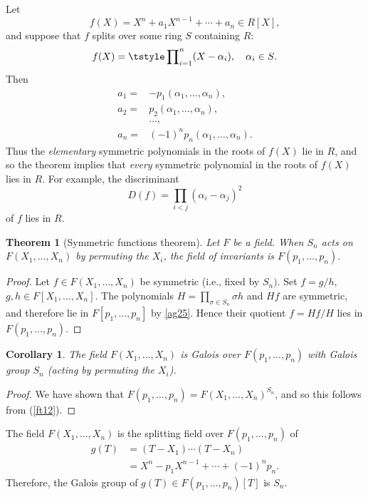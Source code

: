 \documentclass[a4paper,11pt,final,openany]{memoir}
\newtheorem{corollary}[X]{Corollary}
\newtheorem{theorem}[X]{Theorem}
\theoremstyle{nonumberplain}
\newtheorem{proof}{Proof.}
\begin{document}
Let
\[
f(X)=X^{n}+a_{1}X^{n-1}+\cdots+a_{n}\in R[X],
\]
and suppose that $f$ splits over some ring $S$ containing $R$:
\[
f(X)=\tstyle\prod\nolimits_{i=1}^{n}(X-\alpha_{i}),\quad\alpha_{i}\in
S\text{.}%
\]
Then
\begin{align*}
a_{1}=&-p_{1}(\alpha_{1},\ldots,\alpha_{n}),\\
 a_{2}=&p_{2}(\alpha_{1}%
,\ldots,\alpha_{n}),\\
&\ldots,\\
 a_{n}=&(-1)^{n}p_{n}(\alpha_{1}%
,\ldots,\alpha_{n}).
\end{align*}
Thus the \textit{elementary}\emph{\/} symmetric polynomials in the roots of
$f(X)$ lie in $R$, and so the theorem implies that \textit{every}\emph{\/}
symmetric polynomial in the roots of $f(X)$ lies in $R$. For example, the
discriminant
\[
D(f)=\prod_{i<j}(\alpha_{i}-\alpha_{j})^{2}%
\]
of $f$ lies in $R$.

\begin{theorem}
[Symmetric functions theorem]\label{ag26}Let $F$ be a field. When $S_{n}$ acts
on $F(X_{1},...,X_{n})$ by permuting the $X_{i}$, the field of invariants is
$F(p_{1},...,p_{n}).$
\end{theorem}

\begin{proof}
Let $f\in F(X_{1},\ldots,X_{n})$ be symmetric (i.e., fixed by $S_{n})$. Set
$f=g/h$, $g,h\in F[X_{1},\ldots,X_{n}]$. The polynomials $H=\prod_{\sigma\in
S_{n}}\sigma h$ and $Hf$ are symmetric, and therefore lie in $F[p_{1}%
,\ldots,p_{n}]$ by \ref{ag25}. Hence their quotient $f=Hf/H$ lies in
$F(p_{1},\ldots,p_{n})$.
\end{proof}

\begin{corollary}
\label{ag27}The field $F(X_{1},...,X_{n})$ is Galois over $F(p_{1},...,p_{n})$
with Galois group $S_{n}$ (acting by permuting the $X_{i}$).
\end{corollary}

\begin{proof}
We have shown that $F(p_{1},\ldots,p_{n})=F(X_{1},\ldots,X_{n})^{S_{n}}$, and
so this follows from (\ref{ft12}).
\end{proof}

The field $F(X_{1},\ldots,X_{n})$ is the splitting field over $F(p_{1}%
,\ldots,p_{n})$ of%
\begin{align*}
g(T)&=(T-X_{1})\cdots(T-X_{n})\\
&=X^{n}-p_{1}X^{n-1}+\cdots+(-1)^{n}p_{n}.
\end{align*}
Therefore, the Galois group of $g(T)\in F(p_{1},\ldots,p_{n})[T]$ is $S_{n}$.
\end{document}
